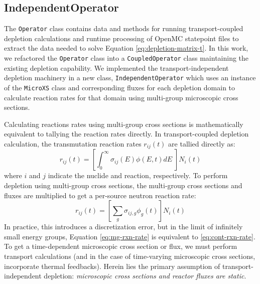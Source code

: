     \subsection{IndependentOperator}
        The \verb.Operator. class contains data and methods for running
        transport-coupled depletion calculations and runtime processing of
        OpenMC statepoint files to extract the data needed to solve Equation
        \ref{eq:depletion-matrix-t}. In this work, we refactored the
        \verb.Operator. class into a \verb.CoupledOperator.  class maintaining
        the existing depletion capability. We implemented the
        transport-independent depletion machinery in a new class,
        \verb.IndependentOperator. which uses an instance of the \verb.MicroXS.
        class and corresponding fluxes for each depletion domain to calculate
        reaction rates for that domain using multi-group microscopic cross
        sections.

        Calculating reactions rates using multi-group cross sections is
        mathematically equivalent to tallying the reaction rates directly. In
        transport-coupled depletion calculation, the transmutation reaction
        rates $r_{ij}(t)$ are tallied directly as:
        \begin{equation}
            \label{eq:cont-rxn-rate}
            r_{ij}(t) = \left[\int_0^\infty \sigma_{ij}(E) \phi(E,t) dE \; \right]
            N_{i}(t)
        \end{equation}
        where $i$ and $j$ indicate the nuclide and reaction, respectively.
            To perform depletion using multi-group cross sections, the multi-group
        cross sections and fluxes are multiplied to get a per-source neutron
        reaction rate:
        \begin{equation}
            \label{eq:mg-rxn-rate}
            r_{ij}(t) = \left[\sum_{g} \sigma_{ij,g} \phi_{g}(t) \right]
            N_{i}(t) 
        \end{equation}
        In practice, this introduces a discretization error, but in the limit of
        infinitely small energy groups, Equation \ref{eq:mg-rxn-rate} is
        equivalent to \ref{eq:cont-rxn-rate}. To get a time-dependent
        microscopic cross section or flux, we must perform transport
        calculations (and in the case of time-varying microscopic cross
        sections, incorporate thermal feedbacks). Herein lies the primary
        assumption of transport-independent depletion: {\it microscopic cross
        sections and reactor fluxes are static}.

